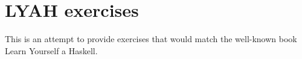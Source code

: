 
\chapter{LYAH exercises}

This is an attempt to provide exercises that would match the well-known book Learn Yourself a Haskell.

